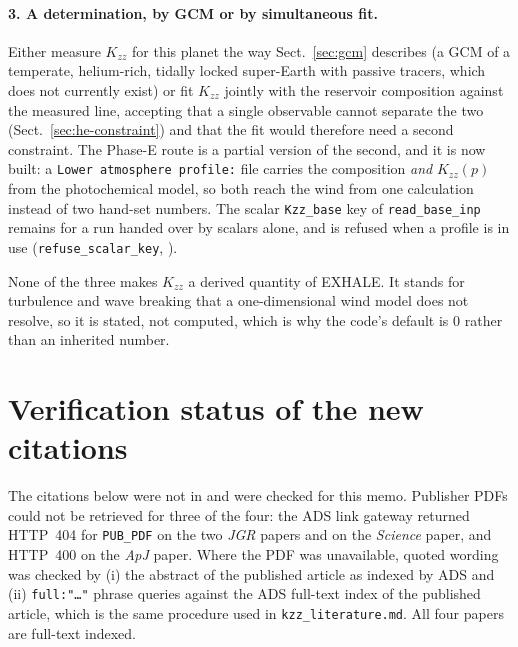 \documentclass[english,a4paper]{my_memo}
\begin{document}
\paragraph{3. A determination, by GCM or by simultaneous fit.} Either
measure $K_{zz}$ for this planet the way Sect.~\ref{sec:gcm} describes
(a GCM of a temperate, helium-rich, tidally locked super-Earth with passive
tracers, which does not currently exist) or fit $K_{zz}$ jointly with the
reservoir composition against the measured line, accepting that a single
observable cannot separate the two (Sect.~\ref{sec:he-constraint}) and that
the fit would therefore need a second constraint. The Phase-E route is a
partial version of the second, and it is now built: a
\texttt{Lower atmosphere profile:} file carries the composition
\emph{and} $K_{zz}(p)$ from the photochemical model, so both reach the wind
from one calculation instead of two hand-set numbers. The scalar
\texttt{Kzz\_base} key of \texttt{read\_base\_inp} remains for a run handed
over by scalars alone, and is refused when a profile is in use
(\texttt{refuse\_scalar\_key},
).

\medskip
\noindent None of the three makes $K_{zz}$ a derived quantity of EXHALE.
It stands for turbulence and wave breaking that a one-dimensional wind model
does not resolve, so it is stated, not computed, which is why the code's
default is $0$ rather than an inherited number.

\section{Verification status of the new citations}
\label{sec:verif}

The citations below were not in  and
were checked for this memo. Publisher PDFs could not be retrieved for three
of the four: the ADS link gateway returned HTTP~404 for
\texttt{PUB\_PDF} on the two \emph{JGR} papers and on the \emph{Science}
paper, and HTTP~400 on the \emph{ApJ} paper. Where the PDF was
unavailable, quoted wording was checked by (i) the abstract of the published
article as indexed by ADS and (ii) \texttt{full:"\ldots"} phrase queries
against the ADS full-text index of the published article, which is the same
procedure used in \texttt{kzz\_literature.md}. All four papers are
full-text indexed.
\end{document}
